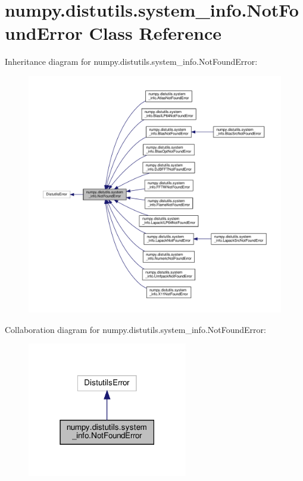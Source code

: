 \hypertarget{classnumpy_1_1distutils_1_1system__info_1_1NotFoundError}{}\section{numpy.\+distutils.\+system\+\_\+info.\+Not\+Found\+Error Class Reference}
\label{classnumpy_1_1distutils_1_1system__info_1_1NotFoundError}


Inheritance diagram for numpy.\+distutils.\+system\+\_\+info.\+Not\+Found\+Error\+:
\nopagebreak
\begin{figure}[H]
\begin{center}
\leavevmode
\includegraphics[width=350pt]{classnumpy_1_1distutils_1_1system__info_1_1NotFoundError__inherit__graph}
\end{center}
\end{figure}


Collaboration diagram for numpy.\+distutils.\+system\+\_\+info.\+Not\+Found\+Error\+:
\nopagebreak
\begin{figure}[H]
\begin{center}
\leavevmode
\includegraphics[width=198pt]{classnumpy_1_1distutils_1_1system__info_1_1NotFoundError__coll__graph}
\end{center}
\end{figure}


